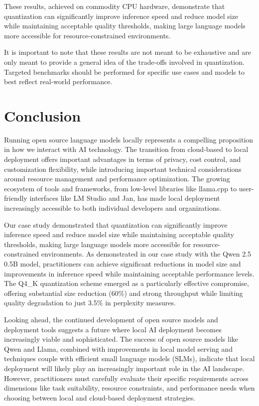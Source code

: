 These results, achieved on commodity CPU hardware, demonstrate that quantization can significantly improve inference speed and reduce model size while maintaining acceptable quality thresholds, making large language models more accessible for resource-constrained environments.

It is important to note that these results are not meant to be exhaustive and are only meant to provide a general idea of the trade-offs involved in quantization. Targeted benchmarks should be performed for specific use cases and models to best reflect real-world performance.

\section{Conclusion}

Running open source language models locally represents a compelling proposition in how we interact with AI technology. The transition from cloud-based to local deployment offers important advantages in terms of privacy, cost control, and customization flexibility, while introducing important technical considerations around resource management and performance optimization. The growing ecosystem of tools and frameworks, from low-level libraries like llama.cpp to user-friendly interfaces like LM Studio and Jan, has made local deployment increasingly accessible to both individual developers and organizations.

Our case study demonstrated that quantization can significantly improve inference speed and reduce model size while maintaining acceptable quality thresholds, making large language models more accessible for resource-constrained environments. As demonstrated in our case study with the Qwen 2.5 0.5B model, practitioners can achieve significant reductions in model size and improvements in inference speed while maintaining acceptable performance levels. The Q4\_K quantization scheme emerged as a particularly effective compromise, offering substantial size reduction (60\%) and strong throughput while limiting quality degradation to just 3.5\% in perplexity measures.

Looking ahead, the continued development of open source models and deployment tools suggests a future where local AI deployment becomes increasingly viable and sophisticated. The success of open source models like Qwen and Llama, combined with improvements in local model serving and techniques couple with efficient small language models (SLMs), indicate that local deployment will likely play an increasingly important role in the AI landscape. However, practitioners must carefully evaluate their specific requirements across dimensions like task suitability, resource constraints, and performance needs when choosing between local and cloud-based deployment strategies.




